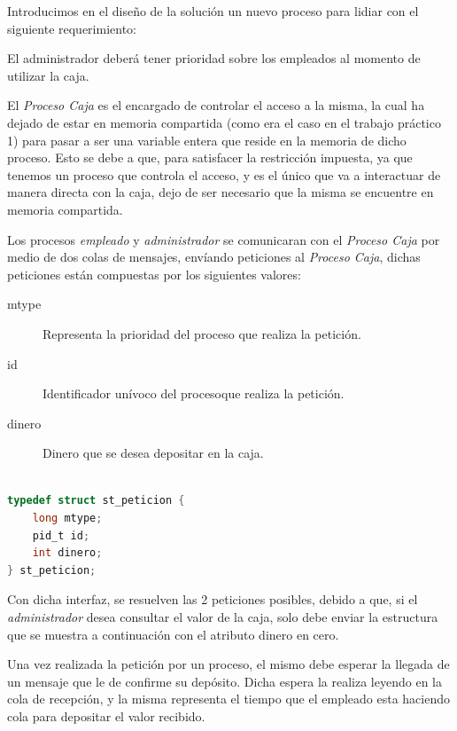 \documentclass[12pt,a4paper,spanish]{article}
\begin{document}
	Introducimos en el diseño de la solución un nuevo proceso para lidiar con el siguiente requerimiento:

	\begin{framed}
	El administrador deberá tener prioridad sobre los empleados al momento de utilizar la caja.
	\end{framed}

	El \emph{Proceso Caja} es el encargado de controlar el acceso a la misma, la cual ha dejado de estar en memoria
	compartida (como era el caso en el trabajo práctico 1) para pasar a ser una variable entera que reside en la
	memoria de dicho proceso.
	Esto se debe a que, para satisfacer la restricción impuesta, ya que tenemos un proceso que controla el acceso,
	y es el único que va a interactuar de manera directa con la caja, dejo de ser necesario que la misma se encuentre
	en memoria compartida.

	Los procesos \emph{empleado} y \emph{administrador} se comunicaran con el \emph{Proceso Caja} por medio de dos colas de mensajes, envíando peticiones al \emph{Proceso Caja}, dichas peticiones están compuestas por los siguientes valores:

	\begin{description}
		\item[mtype] Representa la prioridad del proceso que realiza la petición.
		\item[id] Identificador unívoco del procesoque realiza la petición.
		\item[dinero] Dinero que se desea depositar en la caja.
	\end{description}

	\begin{center}
		\begin{varwidth}{0.5\textwidth}
			\begin{lstlisting}[frame=single, language=C, caption={Peticiones encoladas}]
			
typedef struct st_peticion {
	long mtype;
	pid_t id;
	int dinero;
} st_peticion;
			\end{lstlisting}
		\end{varwidth}
	\end{center}
	Con dicha interfaz, se resuelven las 2 peticiones posibles, debido a que, si el \emph{administrador}
	desea consultar el valor de la caja, solo debe enviar la estructura que se muestra a continuación con el
	atributo dinero en cero.

	Una vez realizada la petición por un proceso, el mismo debe esperar la llegada de un mensaje que le
	de confirme su depósito. Dicha espera la realiza leyendo en la cola de recepción, y la misma representa
	el tiempo que el empleado esta haciendo cola para depositar el valor recibido.
\end{document}
